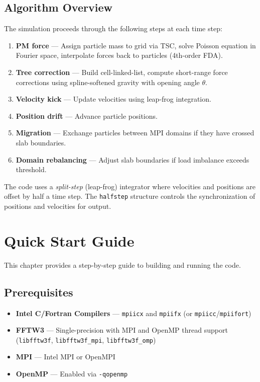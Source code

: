 \documentclass[11pt,fleqn]{book}
\newcommand{\code}[1]{\texttt{#1}}
\begin{document}
\section{Algorithm Overview}

The simulation proceeds through the following steps at each time step:

\begin{enumerate}[leftmargin=2em]
  \item \textbf{PM force} --- Assign particle mass to grid via TSC, solve Poisson equation in Fourier space, interpolate forces back to particles (4th-order FDA).
  \item \textbf{Tree correction} --- Build cell-linked-list, compute short-range force corrections using spline-softened gravity with opening angle $\theta$.
  \item \textbf{Velocity kick} --- Update velocities using leap-frog integration.
  \item \textbf{Position drift} --- Advance particle positions.
  \item \textbf{Migration} --- Exchange particles between MPI domains if they have crossed slab boundaries.
  \item \textbf{Domain rebalancing} --- Adjust slab boundaries if load imbalance exceeds threshold.
\end{enumerate}

\begin{important}
The code uses a \emph{split-step} (leap-frog) integrator where velocities and positions are offset by half a time step.  The \code{halfstep} structure controls the synchronization of positions and velocities for output.
\end{important}


\chapter{Quick Start Guide}
\label{ch:quickstart}

This chapter provides a step-by-step guide to building and running the code.

\section{Prerequisites}

\begin{itemize}[leftmargin=2em]
  \item \textbf{Intel C/Fortran Compilers} --- \code{mpiicx} and \code{mpiifx} (or \code{mpiicc}/\code{mpiifort})
  \item \textbf{FFTW3} --- Single-precision with MPI and OpenMP thread support (\code{libfftw3f}, \code{libfftw3f\_mpi}, \code{libfftw3f\_omp})
  \item \textbf{MPI} --- Intel MPI or OpenMPI
  \item \textbf{OpenMP} --- Enabled via \code{-qopenmp}
\end{itemize}
\end{document}
